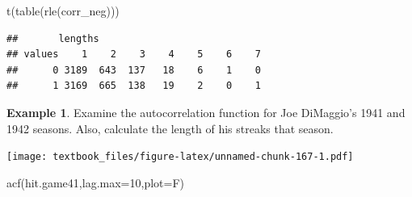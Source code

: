 \documentclass[
  11pt,
]{book}
\newenvironment{Shaded}{\begin{snugshade}}{\end{snugshade}}
\newcommand{\AttributeTok}[1]{\textcolor[rgb]{0.77,0.63,0.00}{#1}}
\newcommand{\CommentTok}[1]{\textcolor[rgb]{0.56,0.35,0.01}{\textit{#1}}}
\newcommand{\ConstantTok}[1]{\textcolor[rgb]{0.00,0.00,0.00}{#1}}
\newcommand{\DecValTok}[1]{\textcolor[rgb]{0.00,0.00,0.81}{#1}}
\newcommand{\FunctionTok}[1]{\textcolor[rgb]{0.00,0.00,0.00}{#1}}
\newcommand{\NormalTok}[1]{#1}
\newcommand{\OtherTok}[1]{\textcolor[rgb]{0.56,0.35,0.01}{#1}}
\newcommand{\SpecialCharTok}[1]{\textcolor[rgb]{0.00,0.00,0.00}{#1}}
\newcommand{\StringTok}[1]{\textcolor[rgb]{0.31,0.60,0.02}{#1}}
\theoremstyle{definition}
\theoremstyle{definition}
\newtheorem{example}{Example}[chapter]
\theoremstyle{definition}
\theoremstyle{definition}
\theoremstyle{remark}
\begin{document}
\begin{Shaded}
\begin{Highlighting}[]
\FunctionTok{t}\NormalTok{(}\FunctionTok{table}\NormalTok{(}\FunctionTok{rle}\NormalTok{(corr\_neg)))}
\end{Highlighting}
\end{Shaded}

\begin{verbatim}
##       lengths
## values    1    2    3    4    5    6    7
##      0 3189  643  137   18    6    1    0
##      1 3169  665  138   19    2    0    1
\end{verbatim}

\newpage

\begin{example}
Examine the autocorrelation function for Joe DiMaggio's 1941 and 1942 seasons. Also, calculate the length of his streaks that season.
\end{example}

\begin{Shaded}
\end{Shaded}

\texttt{[image: textbook\_files/figure-latex/unnamed-chunk-167-1.pdf]}

\begin{Shaded}
\begin{Highlighting}[]
\FunctionTok{acf}\NormalTok{(hit.game41,}\AttributeTok{lag.max=}\DecValTok{10}\NormalTok{,}\AttributeTok{plot=}\NormalTok{F)}
\end{Highlighting}
\end{Shaded}
\end{document}
